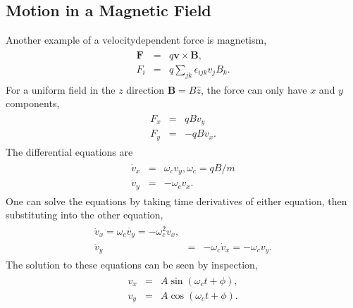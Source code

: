 \documentclass[letterpaper,10pt,english]{sphinxmanual}
\begin{document}
\subsection{Motion in a Magnetic Field}
\label{\detokenize{chapter3:motion-in-a-magnetic-field}}
Another example of a velocity\sphinxhyphen{}dependent force is magnetism,
\begin{equation*}
\begin{split}
\begin{eqnarray}
\boldsymbol{F}&=&q\boldsymbol{v}\times\boldsymbol{B},\\
\nonumber
F_i&=&q\sum_{jk}\epsilon_{ijk}v_jB_k.
\end{eqnarray}
\end{split}
\end{equation*}
For a uniform field in the \(z\) direction \(\boldsymbol{B}=B\hat{z}\), the force can only have \(x\) and \(y\) components,
\begin{equation*}
\begin{split}
\begin{eqnarray}
F_x&=&qBv_y\\
\nonumber
F_y&=&-qBv_x.
\end{eqnarray}
\end{split}
\end{equation*}
The differential equations are
\begin{equation*}
\begin{split}
\begin{eqnarray}
\dot{v}_x&=&\omega_c v_y,\omega_c= qB/m\\
\nonumber
\dot{v}_y&=&-\omega_c v_x.
\end{eqnarray}
\end{split}
\end{equation*}
One can solve the equations by taking time derivatives of either equation, then substituting into the other equation,
\begin{equation*}
\begin{split}
\begin{eqnarray}
\ddot{v}_x=\omega_c\dot{v_y}=-\omega_c^2v_x,\\
\nonumber
\ddot{v}_y&=&-\omega_c\dot{v}_x=-\omega_cv_y.
\end{eqnarray}
\end{split}
\end{equation*}
The solution to these equations can be seen by inspection,
\begin{equation*}
\begin{split}
\begin{eqnarray}
v_x&=&A\sin(\omega_ct+\phi),\\
\nonumber
v_y&=&A\cos(\omega_ct+\phi).
\end{eqnarray}
\end{split}
\end{equation*}
\end{document}
